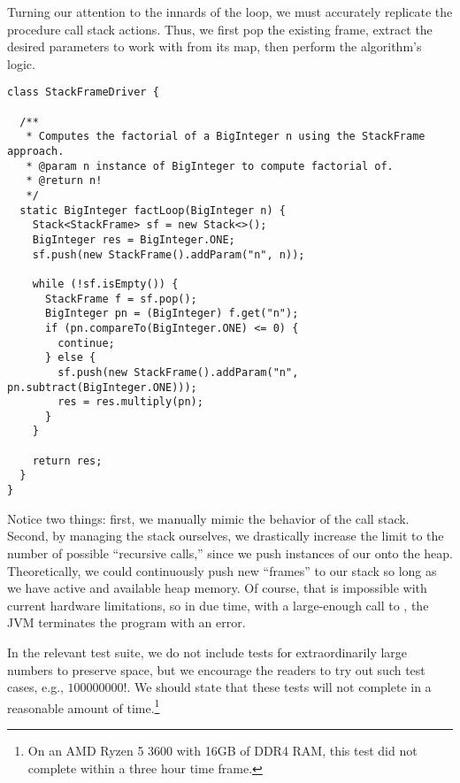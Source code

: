 Turning our attention to the innards of the loop, we must accurately replicate the procedure call stack actions. 
Thus, we first pop the existing frame, extract the desired parameters to work with from its map, then perform the algorithm's logic.

\begin{lstlisting}[language=MyJava]
class StackFrameDriver {

  /**
   * Computes the factorial of a BigInteger n using the StackFrame approach.
   * @param n instance of BigInteger to compute factorial of.
   * @return n!
   */
  static BigInteger factLoop(BigInteger n) {
    Stack<StackFrame> sf = new Stack<>();
    BigInteger res = BigInteger.ONE;
    sf.push(new StackFrame().addParam("n", n));

    while (!sf.isEmpty()) {
      StackFrame f = sf.pop();
      BigInteger pn = (BigInteger) f.get("n");
      if (pn.compareTo(BigInteger.ONE) <= 0) { 
        continue;
      } else {
        sf.push(new StackFrame().addParam("n", pn.subtract(BigInteger.ONE)));
        res = res.multiply(pn);
      }
    }

    return res;
  }
}
\end{lstlisting}

Notice two things: first, we manually mimic the behavior of the call stack. 
Second, by managing the stack ourselves, we drastically increase the limit to the number of possible ``recursive calls,'' since we push instances of our  onto the heap. 
Theoretically, we could continuously push new ``frames'' to our stack so long as we have active and available heap memory. 
Of course, that is impossible with current hardware limitations, so in due time, with a large-enough call to , the JVM terminates the program with an  error. 

In the relevant test suite, we do not include tests for extraordinarily large numbers to preserve space, but we encourage the readers to try out such test cases, e.g., $100000000!$. 
We should state that these tests will not complete in a reasonable amount of time.\footnote{On an AMD Ryzen 5 3600 with 16GB of DDR4 RAM, this test did not complete within a three hour time frame.} 